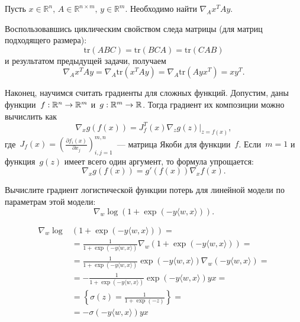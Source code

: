 \documentclass[12pt,fleqn]{article}
\begin{document}
\begin{vkProblem} Пусть $x \in \mathbb{R}^n, \, A \in \mathbb{R}^{n \times m}, \, y \in \mathbb{R}^m.$ Необходимо найти $\nabla_A x^TAy$. 
\end{vkProblem}

\begin{esSolution} Воспользовавшись циклическим свойством следа матрицы (для матриц подходящего размера): 
\[
\text{tr}(ABC) = \text{tr}(BCA) = \text{tr}(CAB)
\]
    и результатом предыдущей задачи, получаем
\[
\nabla_A x^TAy = \nabla_A \text{tr} (x^TAy) =  \nabla_A \text{tr}(Ayx^T) = xy^T.
\]
    
\end{esSolution}

Наконец, научимся считать градиенты для сложных функций.
Допустим, даны функции~$f: \mathbb{R}^n \to \mathbb{R}^m$ и~$g: \mathbb{R}^m \to \mathbb{R}$.
Тогда градиент их композиции можно вычислить как
\[
    \nabla_x g \left( f(x) \right)
    =
    J_{f}^T (x)
    \nabla_z \left. g(z) \right|_{z = f(x)},
\]
где~$J_f (x) = \left( \frac{\partial f_i(x)}{\partial x_j}  \right)_{i, j = 1}^{m, n}$~--- матрица Якоби для функции~$f$.
Если~$m = 1$ и функция~$g(z)$ имеет всего один аргумент, то формула упрощается:
\[
    \nabla_x g \left( f(x) \right)
    =
    g'(f(x))
    \nabla_x f(x).
\]

\begin{vkProblem}
    Вычислите градиент логистической функции потерь для линейной модели по параметрам этой модели:
    \[
        \nabla_w
        \log \left(
            1
            +
            \exp(-y \langle w, x \rangle)
        \right).
    \]
\end{vkProblem}

\begin{esSolution}
    \begin{align*}
        \nabla_w
        \log &\left(
            1
            +
            \exp(-y \langle w, x \rangle)
        \right)
        = \\
        &=
        \frac{
            1
        }{
            1
            +
            \exp(-y \langle w, x \rangle)
        }
        \nabla_w \left(
            1
            +
            \exp(-y \langle w, x \rangle)
        \right)
        =\\
        &=
        \frac{
            1
        }{
            1
            +
            \exp(-y \langle w, x \rangle)
        }
        \exp(-y \langle w, x \rangle)
        \nabla_w \left(
            -y \langle w, x \rangle
        \right)
        =\\
        &=
        -
        \frac{
            1
        }{
            1
            +
            \exp(-y \langle w, x \rangle)
        }
        \exp(-y \langle w, x \rangle)
        y
        x
        =\\
        &=
        \left\{
            \sigma(z)
            =
            \frac{
                1
            }{
                1 + \exp(-z)
            }
        \right\}
        =\\
        &=
        -
        \sigma(-y \langle w, x \rangle)
        y
        x
    \end{align*}
\end{esSolution}
\end{document}
